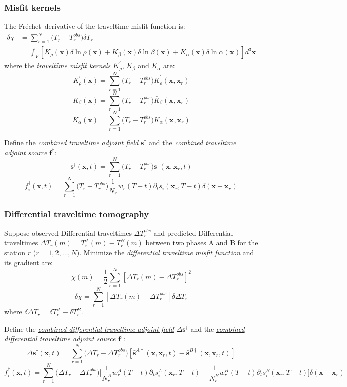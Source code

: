 \documentclass{article}
\newcommand{\mbf}[1]{\mathbf{#1}}
\newcommand{\mynem}[1]{\textsl{\uline{#1}}}
\newcommand{\Frechet}{Fr\'{e}chet~}
\begin{document}
\subsubsection{Misfit kernels}
The \Frechet derivative of the traveltime misfit function is:
\begin{align*}
  \delta\chi & =\sum_{r=1}^N\big(T_r-T_r^{obs}\big)\delta T_r \\
    & =\int_V[K_\rho^\prime(\mbf x)\delta\ln\rho(\mbf x)+K_\beta(\mbf x)\delta\ln\beta(\mbf x)+K_\alpha(\mbf x)\delta\ln\alpha(\mbf x)]d^3\mbf x
\end{align*}
where the \mynem{traveltime misfit kernels} $K_\rho^\prime$, $K_\beta$ and $K_\alpha$ are:
\[ K_\rho^\prime(\mbf x)=\sum_{r=1}^N\big(T_r-T_r^{obs}\big)\bar K_\rho^\prime(\mbf x,\mbf x_r) \]
\[ K_\beta(\mbf x)=\sum_{r=1}^N\big(T_r-T_r^{obs}\big)\bar K_\beta(\mbf x,\mbf x_r) \]
\[ K_\alpha(\mbf x)=\sum_{r=1}^N\big(T_r-T_r^{obs}\big)\bar K_\alpha(\mbf x,\mbf x_r) \]\par
Define the \mynem{combined traveltime adjoint field} $\mbf s^\dagger$ and the \mynem{combined traveltime adjoint source} $\mbf f^\dagger$:
\[ \mbf s^\dagger(\mbf x,t)=\sum_{r=1}^N\big(T_r-T_r^{obs}\big)\bar{\mbf s}^\dagger(\mbf x,\mbf x_r,t) \]
\[ f_i^\dagger(\mbf x,t)=\sum_{r=1}^N\big(T_r-T_r^{obs}\big)\frac{1}{N_r}w_r(T-t)\partial_ts_i(\mbf x_r,T-t)\delta(\mbf x-\mbf x_r) \]\par
\subsubsection{Differential traveltime tomography}
Suppose observed Differential traveltimes $\Delta T_r^{obs}$ and predicted Differential traveltimes $\Delta T_r(m)=T_r^A(m)-T_r^B(m)$ between two phases A and B for the station $r$ ($r=1,2,\ldots,N$). Minimize the \mynem{differential traveltime misfit function} and its gradient are:
\[ \chi(m)=\frac{1}{2}\sum_{r=1}^N[\Delta T_r(m)-\Delta T_r^{obs}]^2 \]
\[ \delta\chi=\sum_{r=1}^N[\Delta T_r(m)-\Delta T_r^{obs}]\delta\Delta T_r \]
where $\delta\Delta T_r=\delta T_r^A-\delta T_r^B$.\par
Define the \mynem{combined differential traveltime adjoint field} $\Delta\mbf s^\dagger$ and the \mynem{combined differential traveltime adjoint source} $\mbf f^\dagger$:
\[ \Delta\mbf s^\dagger(\mbf x,t)=\sum_{r=1}^N\big(\Delta T_r-\Delta T_r^{obs}\big)[\bar{\mbf s}^{A\dagger}(\mbf x,\mbf x_r,t)-\bar{\mbf s}^{B\dagger}(\mbf x,\mbf x_r,t)] \]
\[ f_i^\dagger(\mbf x,t)=\sum_{r=1}^N\big(\Delta T_r-\Delta T_r^{obs}\big)\Big[\frac{1}{N_r^A}w_r^A(T-t)\partial_ts_i^A(\mbf x_r,T-t)-\frac{1}{N_r^B}w_r^B(T-t)\partial_ts_i^B(\mbf x_r,T-t)\Big]\delta(\mbf x-\mbf x_r) \]\par
\end{document}
